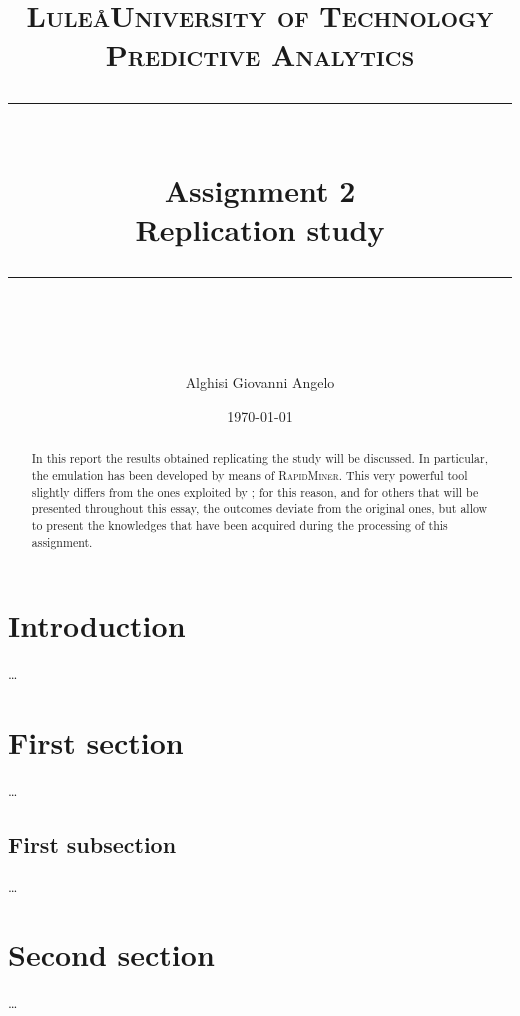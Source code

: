 \documentclass[a4paper]{article}
\title{
	\large 
	\textsc{Lule\aa University of Technology\\[5pt] 
		Predictive Analytics} \\[10pt]
	\rule{\linewidth}{0.5pt}\\
	\vspace{0.3cm}
	\Large Assignment 2\\
	\vspace{0.3cm}
	\huge \bf Replication study\normalsize
	\vspace{0.3cm}
	\rule{\linewidth}{0.5pt}  \\
}
\author{Alghisi Giovanni Angelo}
\date{\normalsize \today}
\begin{document}
	
	\maketitle
	
	\begin{abstract}
		In this report the results obtained replicating the study \cite{article:muller} will be discussed. In particular, the emulation has been developed by means of \textsc{RapidMiner}. This very powerful tool slightly differs from the ones exploited by \citeauthor{article:muller}; for this reason, and for others that will be presented throughout this essay, the outcomes deviate from the original ones, but allow to present the knowledges that have been acquired during the processing of this assignment. 
	\end{abstract}
	
	\tableofcontents
	
	\section{Introduction}
		\dots
	
	\section{First section}
		\dots
			
		\subsection*{First subsection}
			\dots
			
	\section{Second section}
		\dots
		
	\nocite{*}
	\printbibliography 
		
\end{document}
